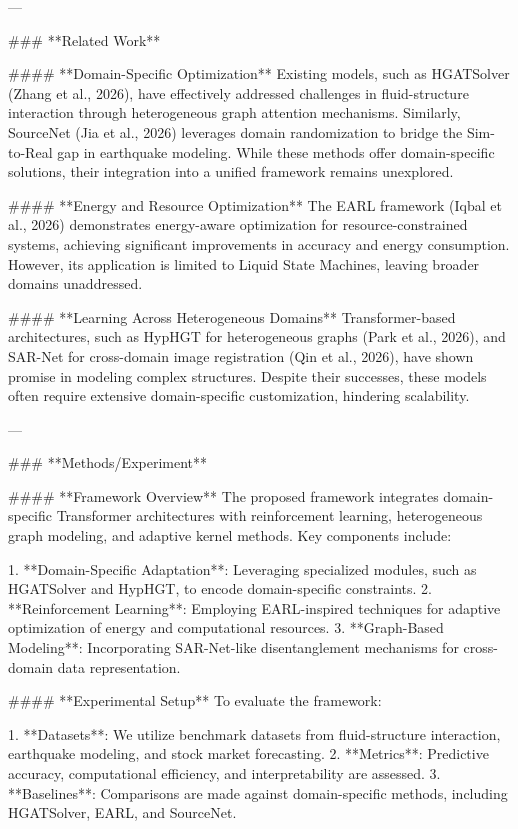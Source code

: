 ---

### **Related Work**

#### **Domain-Specific Optimization**
Existing models, such as HGATSolver (Zhang et al., 2026), have effectively addressed challenges in fluid-structure interaction through heterogeneous graph attention mechanisms. Similarly, SourceNet (Jia et al., 2026) leverages domain randomization to bridge the Sim-to-Real gap in earthquake modeling. While these methods offer domain-specific solutions, their integration into a unified framework remains unexplored.

#### **Energy and Resource Optimization**
The EARL framework (Iqbal et al., 2026) demonstrates energy-aware optimization for resource-constrained systems, achieving significant improvements in accuracy and energy consumption. However, its application is limited to Liquid State Machines, leaving broader domains unaddressed.

#### **Learning Across Heterogeneous Domains**
Transformer-based architectures, such as HypHGT for heterogeneous graphs (Park et al., 2026), and SAR-Net for cross-domain image registration (Qin et al., 2026), have shown promise in modeling complex structures. Despite their successes, these models often require extensive domain-specific customization, hindering scalability.

---

### **Methods/Experiment**

#### **Framework Overview**
The proposed framework integrates domain-specific Transformer architectures with reinforcement learning, heterogeneous graph modeling, and adaptive kernel methods. Key components include:

1. **Domain-Specific Adaptation**: Leveraging specialized modules, such as HGATSolver and HypHGT, to encode domain-specific constraints.
2. **Reinforcement Learning**: Employing EARL-inspired techniques for adaptive optimization of energy and computational resources.
3. **Graph-Based Modeling**: Incorporating SAR-Net-like disentanglement mechanisms for cross-domain data representation.

#### **Experimental Setup**
To evaluate the framework:

1. **Datasets**: We utilize benchmark datasets from fluid-structure interaction, earthquake modeling, and stock market forecasting.
2. **Metrics**: Predictive accuracy, computational efficiency, and interpretability are assessed.
3. **Baselines**: Comparisons are made against domain-specific methods, including HGATSolver, EARL, and SourceNet.

